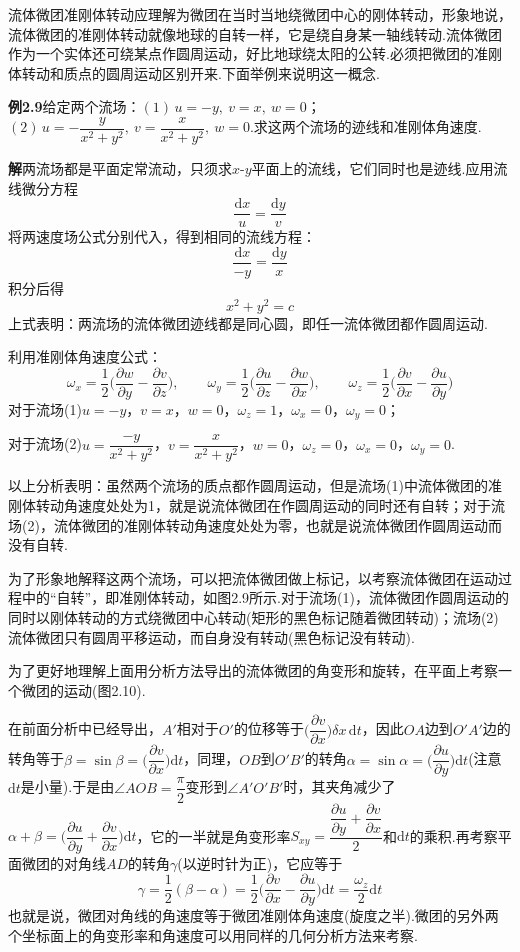 流体微团准刚体转动应理解为微团在当时当地绕微团中心的刚体转动，形象地说，流体微团的准刚体转动就像地球的自转一样，它是绕自身某一轴线转动.流体微团作为一个实体还可绕某点作圆周运动，好比地球绕太阳的公转.必须把微团的准刚体转动和质点的圆周运动区别开来.下面举例来说明这一概念.

\noindent\textbf{例2.9}\quad 给定两个流场：$(1)\,u=-y,\ v=x,\ w=0$；$(2)\,u=-\dfrac{y}{x^{2}+y^{2}},\ v=\dfrac{x}{x^{2}+y^{2}},\ w=0$.求这两个流场的迹线和准刚体角速度.

\noindent\textbf{解}\quad 两流场都是平面定常流动，只须求$x\text{-}y$平面上的流线，它们同时也是迹线.应用流线微分方程
\[
\frac{\mathrm{d}x}{u}=\frac{\mathrm{d}y}{v}
\]
将两速度场公式分别代入，得到相同的流线方程：
\[
\frac{\mathrm{d}x}{-y}=\frac{\mathrm{d}y}{x}
\]
积分后得
\[
x^{2}+y^{2}=c
\]
上式表明：两流场的流体微团迹线都是同心圆，即任一流体微团都作圆周运动.

利用准刚体角速度公式：
\[
\omega_x=\frac{1}{2}\Big(\frac{\partial w}{\partial y}-\frac{\partial v}{\partial z}\Big),\qquad \omega_y=\frac{1}{2}\Big(\frac{\partial u}{\partial z}-\frac{\partial w}{\partial x}\Big),\qquad \omega_z=\frac{1}{2}\Big(\frac{\partial v}{\partial x}-\frac{\partial u}{\partial y}\Big)
\]
对于流场(1)\quad $u=-y$，$v=x$，$w=0$，$\omega_z=1$，$\omega_x=0$，$\omega_y=0$；

对于流场(2)\quad $u=\dfrac{-y}{x^{2}+y^{2}}$，$v=\dfrac{x}{x^{2}+y^{2}}$，$w=0$，$\omega_z=0$，$\omega_x=0$，$\omega_y=0$.

以上分析表明：虽然两个流场的质点都作圆周运动，但是流场(1)中流体微团的准刚体转动角速度处处为1，就是说流体微团在作圆周运动的同时还有自转；对于流场(2)，流体微团的准刚体转动角速度处处为零，也就是说流体微团作圆周运动而没有自转.

为了形象地解释这两个流场，可以把流体微团做上标记，以考察流体微团在运动过程中的“自转”，即准刚体转动，如图2.9所示.对于流场(1)，流体微团作圆周运动的同时以刚体转动的方式绕微团中心转动(矩形的黑色标记随着微团转动)；流场(2)流体微团只有圆周平移运动，而自身没有转动(黑色标记没有转动).

为了更好地理解上面用分析方法导出的流体微团的角变形和旋转，在平面上考察一个微团的运动(图2.10).

在前面分析中已经导出，$A'$相对于$O'$的位移等于$\Big(\dfrac{\partial v}{\partial x}\Big)\delta x\,\mathrm{d}t$，因此$OA$边到$O'A'$边的转角等于$\beta=\sin\beta=\Big(\dfrac{\partial v}{\partial x}\Big)\mathrm{d}t$，同理，$OB$到$O'B'$的转角$\alpha=\sin\alpha=\Big(\dfrac{\partial u}{\partial y}\Big)\mathrm{d}t$(注意$\mathrm{d}t$是小量).于是由$\angle AOB=\dfrac{\pi}{2}$变形到$\angle A'O'B'$时，其夹角减少了$\alpha+\beta=\Big(\dfrac{\partial u}{\partial y}+\dfrac{\partial v}{\partial x}\Big)\mathrm{d}t$，它的一半就是角变形率$S_{xy}=\dfrac{\dfrac{\partial u}{\partial y}+\dfrac{\partial v}{\partial x}}{2}$和$\mathrm{d}t$的乘积.再考察平面微团的对角线$AD$的转角$\gamma$(以逆时针为正)，它应等于
\[
\gamma=\frac{1}{2}(\beta-\alpha)=\frac{1}{2}\Big(\frac{\partial v}{\partial x}-\frac{\partial u}{\partial y}\Big)\mathrm{d}t=\frac{\omega_z}{2}\mathrm{d}t
\]
也就是说，微团对角线的角速度等于微团准刚体角速度(旋度之半).微团的另外两个坐标面上的角变形率和角速度可以用同样的几何分析方法来考察.

